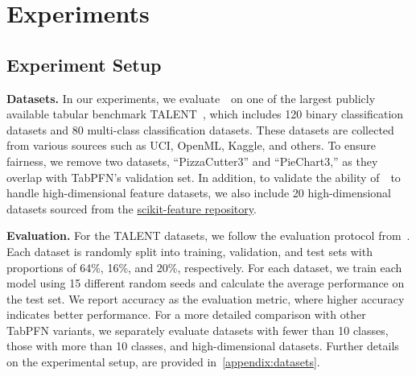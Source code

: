 \section{Experiments}
\label{sec:exp}
\subsection{Experiment Setup}
\textbf{Datasets.} In our experiments, we evaluate~\name~on one of the largest publicly available tabular benchmark TALENT~\cite{YeACloser}, which includes 120 binary classification datasets and 80 multi-class classification datasets. These datasets are collected from various sources such as UCI, OpenML, Kaggle, and others. To ensure fairness, we remove two datasets, ``PizzaCutter3'' and ``PieChart3,'' as they overlap with TabPFN’s validation set.
In addition, to validate the ability of~\name~to handle high-dimensional feature datasets, we also include 20 high-dimensional datasets sourced from the \href{https://jundongl.github.io/scikit-feature/datasets}{scikit-feature repository}. 

\textbf{Evaluation.}
For the TALENT datasets, we follow the evaluation protocol from~\cite{GorishniyRKB21Revisiting}. Each dataset is randomly split into training, validation, and test sets with proportions of 64\%, 16\%, and 20\%, respectively. For each dataset, we train each model using 15 different random seeds and calculate the average performance on the test set. We report accuracy as the evaluation metric, where higher accuracy indicates better performance.
For a more detailed comparison with other TabPFN variants,  we separately evaluate datasets with fewer than 10 classes, those with more than 10 classes, and high-dimensional datasets. Further details on the experimental setup, are provided in~\autoref{appendix:datasets}.


